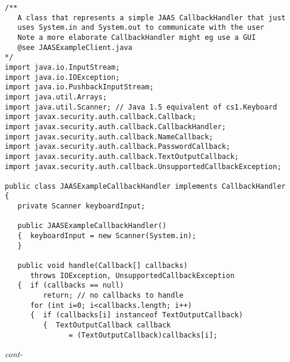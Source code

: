 \begin{figure*}\begin{program}\begin{verbatim}
/**
   A class that represents a simple JAAS CallbackHandler that just
   uses System.in and System.out to communicate with the user
   Note a more elaborate CallbackHandler might eg use a GUI
   @see JAASExampleClient.java
*/
import java.io.InputStream;
import java.io.IOException;
import java.io.PushbackInputStream;
import java.util.Arrays;
import java.util.Scanner; // Java 1.5 equivalent of cs1.Keyboard
import javax.security.auth.callback.Callback;
import javax.security.auth.callback.CallbackHandler;
import javax.security.auth.callback.NameCallback;
import javax.security.auth.callback.PasswordCallback;
import javax.security.auth.callback.TextOutputCallback;
import javax.security.auth.callback.UnsupportedCallbackException;

public class JAASExampleCallbackHandler implements CallbackHandler
{
   private Scanner keyboardInput;

   public JAASExampleCallbackHandler()
   {  keyboardInput = new Scanner(System.in);
   }

   public void handle(Callback[] callbacks)
      throws IOException, UnsupportedCallbackException
   {  if (callbacks == null)
         return; // no callbacks to handle
      for (int i=0; i<callbacks.length; i++)
      {  if (callbacks[i] instanceof TextOutputCallback)
         {  TextOutputCallback callback
               = (TextOutputCallback)callbacks[i];
\end{verbatim}\hfill \emph{cont-}\end{program}\end{figure*}%
